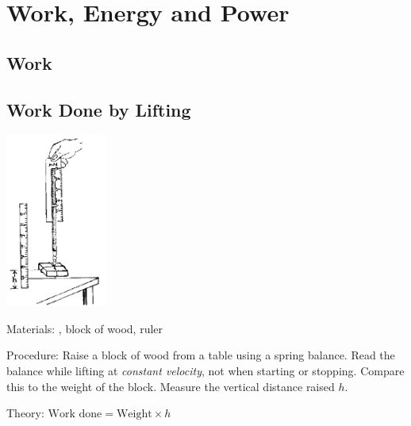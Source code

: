\section{Work, Energy and Power} 

\begin{multicols}{2}


\section*{Work} 


\subsection{Work Done by Lifting}

\begin{center}
\includegraphics[width=0.25\textwidth]{./img/source/work-lifting.png}
\end{center}

\begin{description*}
\item[Materials:]{, block of wood, ruler}
\item[Procedure:]{Raise a block of wood from a table using a spring balance. Read the balance while lifting at \emph{constant velocity}, not when starting or stopping. Compare this to the weight of the block. Measure the vertical distance raised $h$. }
\item[Theory:]{$\text{Work done} = \text{Weight} \times h$}
\end{description*}


\end{multicols}
